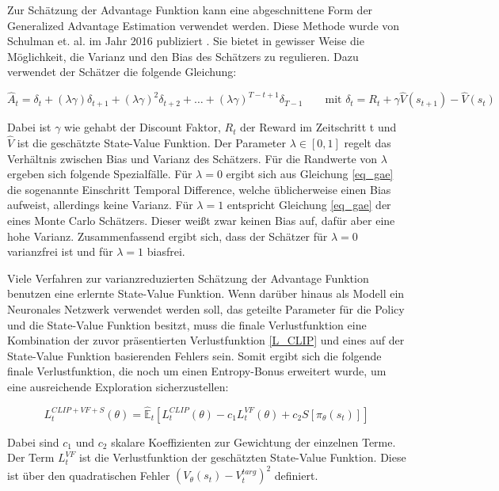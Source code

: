 Zur Schätzung der Advantage Funktion kann eine abgeschnittene Form der Generalized Advantage Estimation verwendet werden. Diese Methode wurde von Schulman et. al. im Jahr 2016 publiziert \cite{GAE}. Sie bietet in gewisser Weise die Möglichkeit, die Varianz und den Bias des Schätzers zu regulieren. Dazu verwendet der Schätzer die folgende Gleichung:

\begin{equation}
  \hat{A}_t = \delta_t + (\lambda \gamma) \delta_{t+1} + (\lambda \gamma)^2 \delta_{t+2} + \dots + (\lambda \gamma)^{T-t+1} \delta_{T-1} \qquad \text{mit } \delta_t = R_t + \gamma \hat{V}(s_{t+1}) - \hat{V}(s_t)
  \label{eq_gae}
\end{equation}

Dabei ist $\gamma$ wie gehabt der Discount Faktor, $R_t$ der Reward im Zeitschritt t und $\hat{V}$ ist die geschätzte State-Value Funktion. Der Parameter $\lambda \in [0, 1]$ regelt das Verhältnis zwischen Bias und Varianz des Schätzers. Für die Randwerte von $\lambda$ ergeben sich folgende Spezialfälle. Für $\lambda = 0$ ergibt sich aus Gleichung \ref{eq_gae} die sogenannte Einschritt Temporal Difference, welche üblicherweise einen Bias aufweist, allerdings keine Varianz. Für $\lambda = 1$ entspricht Gleichung \ref{eq_gae} der eines Monte Carlo Schätzers. Dieser weißt zwar keinen Bias auf, dafür aber eine hohe Varianz. Zusammenfassend ergibt sich, dass der Schätzer für $\lambda = 0$ varianzfrei ist und für $\lambda = 1$ biasfrei.

Viele Verfahren zur varianzreduzierten Schätzung der Advantage Funktion benutzen eine erlernte State-Value Funktion. Wenn darüber hinaus als Modell ein Neuronales Netzwerk verwendet werden soll, das geteilte Parameter für die Policy und die State-Value Funktion besitzt, muss die finale Verlustfunktion eine Kombination der zuvor präsentierten Verlustfunktion \eqref{L_CLIP} und eines auf der State-Value Funktion basierenden Fehlers sein. Somit ergibt sich die folgende finale Verlustfunktion, die noch um einen Entropy-Bonus erweitert wurde, um eine ausreichende Exploration sicherzustellen:

\begin{equation}
	L_t^{CLIP+VF+S}(\theta) = \hat{\mathbb{E}}_t[L_t^{CLIP}(\theta) - c_1 L_t^{VF}(\theta) + c_2 S[\pi_\theta(s_t)]]
  \label{L_gesamt}
\end{equation}

Dabei sind $c_1$ und $c_2$ skalare Koeffizienten zur Gewichtung der einzelnen Terme. Der Term $L_t^{VF}$ ist die Verlustfunktion der geschätzten State-Value Funktion. Diese ist über den quadratischen Fehler $(V_\theta(s_t) - V_t^{targ})^2$ definiert.

